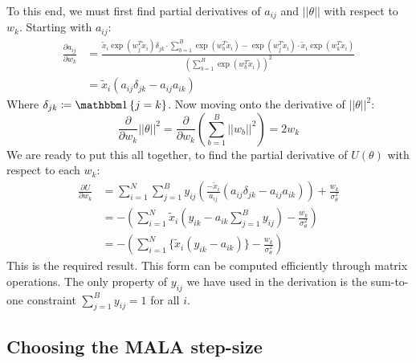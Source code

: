 To this end, we must first find partial derivatives of $a_{ij}$ and $||\theta||$ with respect to $w_k$. Starting with $a_{ij}$:
%
\begin{align}
	\frac{\partial a_{ij}}{\partial w_k} &= \frac
	{\tilde{x}_i \exp(w_j^T \tilde{x}_i) \delta_{jk} \cdot \sum_{b=1}^{B} \exp(w_b^T \tilde{x}_i) 
		- 
		\exp(w_j^T \tilde{x}_i) \cdot \tilde{x}_i \exp(w_k^T \tilde{x}_i)}
	{\left( \sum_{b=1}^{B} \exp(w_b^T \tilde{x}_i) \right)^2} \nonumber \\
	&= \tilde{x}_i \left( a_{ij} \delta_{jk} - a_{ij}a_{ik} \right) 
\end{align}
%
Where $\delta_{jk} \coloneqq \one \left\{ j = k \right\}$. Now moving onto the derivative of $||\theta||^2$:
%
\begin{equation}
	\frac{ \partial}{\partial w_k} ||\theta||^2 = \frac{\partial}{\partial w_k} \left( \sum_{b=1}^B ||w_b||^2 \right) = 2w_k
\end{equation}
%
We are ready to put this all together, to find the partial derivative of $U(\theta)$ with respect to each $w_k$:
\begin{align}
	\frac{\partial U}{\partial w_k} &= 
	\sum_{i=1}^{N} \sum_{j=1}^{B} y_{ij} 
	\left( \frac{-\tilde{x}_i}{a_{ij}} \left( a_{ij} \delta_{jk} - a_{ij} a_{ik} \right) \right)
	+ \frac{w_k}{\sigma_\theta^2} \nonumber \\
	&=  - \left( \sum_{i=1}^{N} \tilde{x}_i \left( y_{ik} - a_{ik} \sum_{j=1}^{B} y_{ij} \right)
	- \frac{w_k}{\sigma_\theta^2} \right) \nonumber \\
	&= - \left( \sum_{i=1}^{N} \Big\{ \tilde{x}_i (y_{ik} - a_{ik}) \Big\} - \frac{w_k}{\sigma_\theta^2} \right)
\end{align}
%
This is the required result. This form can be computed efficiently through matrix operations. The only property of $y_{ij}$ we have used in the derivation is the sum-to-one constraint $\sum_{j=1}^{B} y_{ij} = 1$ for all $i$.

\subsection{Choosing the MALA step-size}
\label{appdx:step-size}

